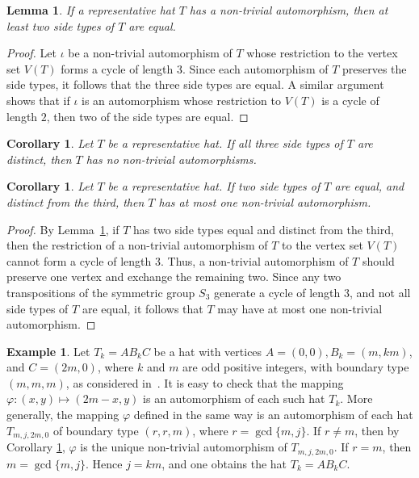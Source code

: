\documentclass[12pt]{amsart}
\def\p{\varphi}
\theoremstyle{plain}
\newtheorem{corollary}[theorem]{Corollary}
\newtheorem{lemma}[theorem]{Lemma}
\theoremstyle{definition}
\newtheorem{example}[theorem]{Example}
\numberwithin{equation}{section}
\begin{document}
\begin{lemma}\label{L:sidetypes}
 If a representative hat $T$ has a non-trivial automorphism,
then at least two side types of $T$ are equal.
\end{lemma}

\begin{proof}
Let $\iota$ be a non-trivial automorphism of $T$ whose restriction to the vertex set $V(T)$ forms  a cycle of length $3$. Since each automorphism of $T$ preserves the side types,
it follows that the three side types are equal. A similar argument shows that if $\iota$ is an
automorphism whose restriction to $V(T)$ is a  cycle of length $2$,  then two of the side types are equal.
\end{proof}


\begin{corollary}\label{C:difftypes}
Let $T$ be a representative  hat. If all three side types of $T$ are distinct, then
$T$ has no non-trivial automorphisms.
\end{corollary}



\begin{corollary}\label{C:twoequal}
Let $T$ be a representative hat. If two side types of $T$ are equal, and distinct from the third, then $T$ has at most one non-trivial automorphism.
\end{corollary}

\begin{proof}
By Lemma~\ref{L:sidetypes}, if $T$ has two side types equal and distinct from the third, then the restriction of a non-trivial automorphism of $T$ to the vertex set $V(T)$ cannot form a  cycle of length $3$. Thus, a non-trivial automorphism of $T$ should preserve one vertex and exchange the remaining two. Since any two  transpositions of the symmetric group $S_3$ generate a cycle of length $3$, and not all side types of $T$ are equal, it follows that $T$ may have at most one non-trivial automorphism.
\end{proof}




\begin{example}\label{Ex:rrm}
Let $T_k = AB_kC$ be a hat with vertices $A = (0,0), B_k = (m,km)$, and $C = (2m,0)$, where $k$
and $m$ are odd positive integers, with boundary type $(m,m,m)$, as considered
in~\cite[Ex.~4.3]{MR25}.
It is easy to check that the mapping $\p:(x,y) \mapsto (2m-x,y)$ is an automorphism of each such hat $T_k$. More generally, the mapping $\p$ defined in the same way
is an automorphism of each hat $T_{m,j,2m,0}$ of boundary type $(r,r,m)$, where $r =
\gcd\{m,j\}$. If $r \ne m$, then by Corollary \ref{C:twoequal}, $\p$ is the unique non-trivial
automorphism of $T_{m,j,2m,0}$. If $r = m$, then $m = \gcd\{m,j\}$. Hence $j = km$, and one
obtains the hat $T_k = AB_{k}C$.
\end{example}
\end{document}
